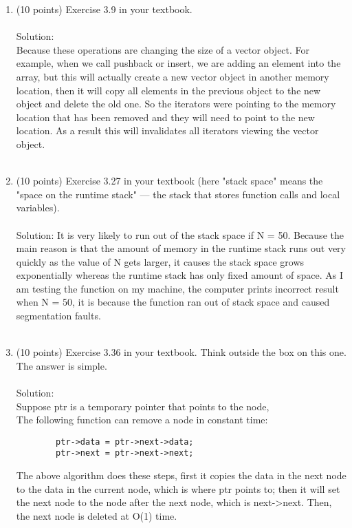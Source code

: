 \documentclass[12pt]{article}
\begin{document}
\begin{enumerate}
\item (10 points) Exercise 3.9 in your textbook. 
\\\\Solution:
\\Because these operations are changing the size of a vector object. For example, when we call pushback or insert, we are adding an element into the array, but this will actually create a new vector object in another memory location, then it will copy all elements in the previous object to the new object and delete the old one. So the iterators were pointing to the memory location that has been removed and they will need to point to the new location. As a result this will invalidates all iterators viewing the vector object.
\\\\
\item (10 points) Exercise 3.27 in your textbook (here "stack space" means the 
"space on the runtime stack" — the stack that stores function calls and local variables). 
\\\\Solution: It is very likely to run out of the stack space if N = 50. Because the main reason is that the amount of memory in the runtime stack runs out very quickly as the value of N gets larger, it causes the stack space grows exponentially whereas the runtime stack has only fixed amount of space. As I am testing the function on my machine, the computer prints incorrect result when N = 50, it is because the function ran out of stack space and caused segmentation faults. 
\\\\

\item (10 points) Exercise 3.36 in your textbook. Think outside the box on this one. 
The answer is simple. 
\\\\Solution:
\\Suppose ptr is a temporary pointer that points to the node,
\\The following function can remove a node in constant time:
\begin{verbatim}
		ptr->data = ptr->next->data;
		ptr->next = ptr->next->next;		
\end{verbatim}
The above algorithm does these steps, first it copies the data in the next node to the data in the current node, which is where ptr points to; then it will set the next node to the node after the next node, which is next->next. Then, the next node is deleted at O(1) time.

\end{enumerate}
\end{document}
